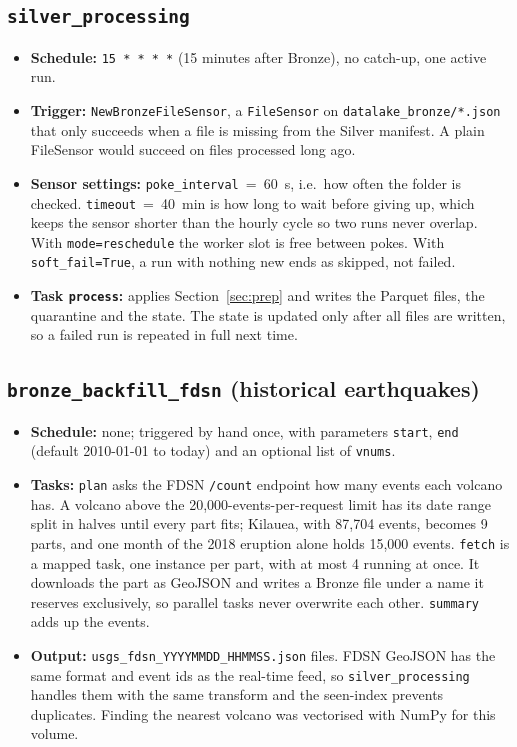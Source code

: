 \documentclass[11pt,a4paper]{article}
\begin{document}
\subsection{\texttt{silver\_processing}}
\begin{itemize}
  \item \textbf{Schedule:} \texttt{15 * * * *} (15 minutes after Bronze), no catch-up, one active run.
  \item \textbf{Trigger:} \texttt{NewBronzeFileSensor}, a \texttt{FileSensor} on \texttt{datalake\_bronze/*.json} that only succeeds when a file is missing from the Silver manifest. A plain FileSensor would succeed on files processed long ago.
  \item \textbf{Sensor settings:} \texttt{poke\_interval}~=~60~s, i.e.\ how often the folder is checked. \texttt{timeout}~=~40~min is how long to wait before giving up, which keeps the sensor shorter than the hourly cycle so two runs never overlap. With \texttt{mode=reschedule} the worker slot is free between pokes. With \texttt{soft\_fail=True}, a run with nothing new ends as skipped, not failed.
  \item \textbf{Task \texttt{process}:} applies Section~\ref{sec:prep} and writes the Parquet files, the quarantine and the state. The state is updated only after all files are written, so a failed run is repeated in full next time.
\end{itemize}

\subsection{\texttt{bronze\_backfill\_fdsn} (historical earthquakes)}\label{sec:backfill}
\begin{itemize}
  \item \textbf{Schedule:} none; triggered by hand once, with parameters \texttt{start}, \texttt{end} (default 2010-01-01 to today) and an optional list of \texttt{vnums}.
  \item \textbf{Tasks:} \texttt{plan} asks the FDSN \texttt{/count} endpoint how many events each volcano has. A volcano above the 20,000-events-per-request limit has its date range split in halves until every part fits; Kilauea, with 87,704 events, becomes 9 parts, and one month of the 2018 eruption alone holds 15,000 events. \texttt{fetch} is a mapped task, one instance per part, with at most 4 running at once. It downloads the part as GeoJSON and writes a Bronze file under a name it reserves exclusively, so parallel tasks never overwrite each other. \texttt{summary} adds up the events.
  \item \textbf{Output:} \texttt{usgs\_fdsn\_YYYYMMDD\_HHMMSS.json} files. FDSN GeoJSON has the same format and event ids as the real-time feed, so \texttt{silver\_processing} handles them with the same transform and the seen-index prevents duplicates. Finding the nearest volcano was vectorised with NumPy for this volume.
\end{itemize}
\end{document}
